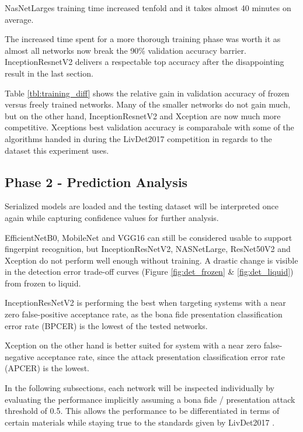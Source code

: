 


NasNetLarges training time increased tenfold and it takes almost 40 minutes on average.





The increased time spent for a more thorough training phase was worth it as almost all networks now break the 90\% validation accuracy barrier.
InceptionResnetV2 delivers a respectable top accuracy after the disappointing result in the last section.





Table \ref{tbl:training_diff} shows the relative gain in validation accuracy of frozen versus freely trained networks.
Many of the smaller networks do not gain much, but on the other hand, InceptionResnetV2 and Xception are now much more competitive.
Xceptions best validation accuracy is comparabale with some of the algorithms handed in during the LivDet2017 competition in regards to the dataset this experiment uses. \cite{LIVDET}

\hfill

\subsection{Phase 2 - Prediction Analysis}
Serialized models are loaded and the testing dataset will be interpreted once again while capturing confidence values for further analysis.

EfficientNetB0, MobileNet and VGG16 can still be considered usable to support fingerpint recognition, but InceptionResNetV2, NASNetLarge, ResNet50V2 and Xception do not perform well enough without training.
A drastic change is visible in the detection error trade-off curves (Figure \ref{fig:det_frozen} \& \ref{fig:det_liquid}) from frozen to liquid.

InceptionResNetV2 is performing the best when targeting systems with a near zero false-positive acceptance rate, as the bona fide presentation classification error rate (BPCER) is the lowest of the tested networks.

Xception on the other hand is better suited for system with a near zero false-negative acceptance rate, since the attack presentation classification error rate (APCER) is the lowest.





In the following subsections, each network will be inspected individually by evaluating the performance implicitly assuming a bona fide / presentation attack threshold of 0.5.
This allows the performance to be differentiated in terms of certain materials while staying true to the standards given by LivDet2017 \cite{LIVDET}.


